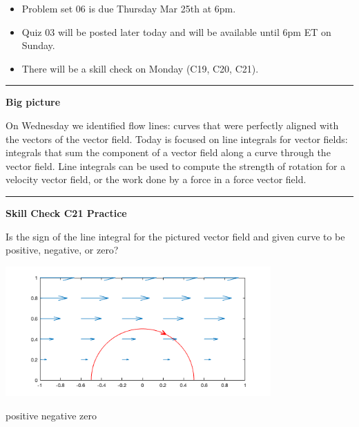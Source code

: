 \documentclass[12pt,letterpaper,noanswers]{exam}
\begin{document}
 \pdfpageheight 11in 
  \pdfpagewidth 8.5in





\begin{itemize}
\itemsep0em
    \item Problem set 06 is due Thursday Mar 25th at 6pm.
    \item Quiz 03 will be posted later today and will be available until 6pm ET on Sunday.
    \item There will be a skill check on Monday (C19, C20, C21).
\end{itemize}

\hrule
\vspace{0.2cm}


\noindent\textbf{Big picture}

On Wednesday we identified flow lines: curves that were perfectly aligned with the vectors of the vector field.  Today is focused on line integrals for vector fields: integrals that sum the component of a vector field along a curve through the vector field.  Line integrals can be used to compute the strength of rotation for a velocity vector field, or the work done by a force in a force vector field.

\vspace{0.2cm}
\hrule
\vspace{0.2cm}



\noindent\textbf{Skill Check C21 Practice}
\begin{questions}
\question Is the sign of the line integral for the pictured vector field and given curve to be positive, negative, or zero?

\includegraphics[width=4in]{img/C21lineintegral-p1.png}

\begin{oneparcheckboxes}
\choice positive
\choice negative
\choice zero
\end{oneparcheckboxes}
\end{questions}
\end{document}
